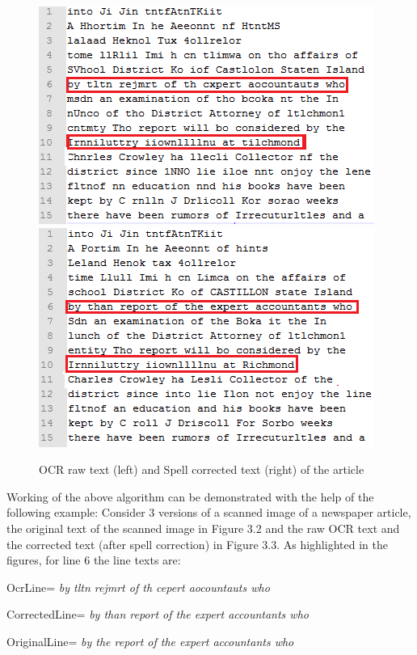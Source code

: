 \documentclass[letterpaper,11pt]{report}
\begin{document}
\begin{figure}[h]
\includegraphics[scale=0.75]{ocr3}
\includegraphics[scale=0.75]{corrected3}
\caption{OCR raw text (left) and Spell corrected text (right) of the article}
\end{figure}
\newpage Working of the above algorithm can be demonstrated with the help of the following example:
Consider 3 versions of a scanned image of a newspaper article,  the original text of the scanned image in Figure 3.2 and the raw OCR text and the corrected text (after spell correction) in Figure 3.3. As highlighted in the figures, for line 6 the line texts are:

\newpage OcrLine= \textit{by tltn rejmrt of th cepert aocountauts who}

CorrectedLine= \textit{by than report of the expert accountants who}

OriginalLine= \textit{by the report of the expert accountants who} 
\end{document}
